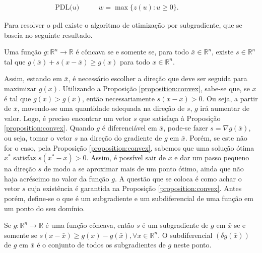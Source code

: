 \begin{align*}
    \text{PDL($u$) } & & & w = \max \{z(u) : u \geq 0\}. & & & & &
\end{align*}

Para  resolver  o  \gls{pdl}  existe o  algoritmo  de  otimização  por
subgradiente, que se baseia no seguinte resultado.

\begin{proposition} \label{proposition:convex}
Uma função  $g : \mathbb{R}^n  \rightarrow \mathbb{R}$ é côncava  se e
somente  se,  para todo  $\bar{x}  \in  \mathbb{R}^n$, existe  $s  \in
\mathbb{R}^n$ tal  que $g(\bar{x})  + s(x -  \bar{x}) \geq  g(x)$ para
todo $x \in \mathbb{R}^n$.
\end{proposition}

Assim, estando em $\bar{x}$, é  necessário escolher a direção que deve
ser   seguida  para   maximizar  $g(x)$.    Utilizando  a   Proposição
\ref{proposition:convex},  sabe-se  que, se  $x$  é  tal que  $g(x)  >
g(\bar{x})$, então  necessariamente $s(x -  \bar{x}) > 0$. Ou  seja, a
partir de $\bar{x}$, movendo-se uma  quantidade adequada na direção de
$s$, $g$ irá aumentar de valor. Logo, é preciso encontrar um vetor $s$
que  satisfaça à  Proposição \ref{proposition:convex}.   Quando $g$  é
diferenciável em $\bar{x}$, pode-se fazer  $s = \nabla g(\bar{x})$, ou
seja, tomar o  vetor $s$ na direção do gradiente  de $g$ em $\bar{x}$.
Porém,    se    este    não    for    o    caso,    pela    Proposição
\ref{proposition:convex}, sabemos que uma solução ótima $x^*$ satisfaz
$s(x^* - \bar{x}) >  0$. Assim, é possível sair de  $\bar{x}$ e dar um
passo pequeno na direção  $s$ de modo a se aproximar  mais de um ponto
ótimo, ainda que não haja acréscimo  no valor da função $g$. A questão
que se coloca é como achar o  vetor $s$ cuja existência é garantida na
Proposição \ref{proposition:convex}. Antes porém, define-se o que é um
subgradiente e  um subdiferencial  de uma  função em  um ponto  do seu
domínio.

\begin{definition}\label{definition:subgradient}
Se $g  : \mathbb{R}^n  \rightarrow \mathbb{R}$  é uma  função côncava,
então $s$ é um subgradiente de $g$ em $\bar{x}$ se e somente se $s(x -
\bar{x})  \geq g(x)  -  g(\bar{x}), \forall  x  \in \mathbb{R}^n$.   O
subdiferencial $(\delta g(\bar{x}))$ de $g$  em $\bar{x}$ é o conjunto
de todos os subgradientes de $g$ neste ponto.
\end{definition}

